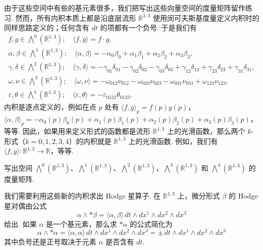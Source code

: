 由于这些空间中有些的基元素很多，我们把写出这些向量空间的度量矩阵留作练习. 然而，所有内积本质上都是沿底层流形 $\mathbb{R}^{1,3}$ 使用闵可夫斯基度量定义内积时的同样思路定义的；任何含有 $dt$ 的项都有一个负号. 于是我们有
\begin{align*}
f,g\in\bigwedge^0(\mathbb{R}^{1,3});\quad \langle f,g\rangle=f\cdot g, \\
\alpha,\beta\in\bigwedge^1(\mathbb{R}^{1,3});\quad \langle\alpha,\beta\rangle=-\alpha_0\beta_0+\alpha_1\beta_1+\alpha_2\beta_2+\alpha_3\beta_3, \\
\gamma,\delta\in\bigwedge^2(\mathbb{R}^{1,3});\quad \langle\gamma,\delta\rangle=-\gamma_{01}\delta_{01}-\gamma_{02}\delta_{02}-\gamma_{03}\delta_{03}+\gamma_{12}\delta_{12}+\gamma_{23}\delta_{23}+\gamma_{31}\delta_{31}, \\
\omega,\nu\in\bigwedge^3(\mathbb{R}^{1,3});\quad \langle\omega,\nu\rangle=-\omega_{012}\nu_{012}-\omega_{023}\nu_{023}-\omega_{031}\nu_{031}+\omega_{123}\nu_{123}, \\
\varepsilon,\theta\in\bigwedge^4(\mathbb{R}^{1,3});\quad \langle\varepsilon,\theta\rangle=-\varepsilon_{0123}\theta_{0123}.
\end{align*}
内积是逐点定义的，例如在点 $p$ 处有 $\langle f,g\rangle_p=f(p)g(p)$，$\langle\alpha,\beta\rangle_p=-\alpha_0(p)\beta_0(p)+\alpha_1(p)\beta_1(p)+\alpha_2(p)\beta_2(p)+\alpha_3(p)\beta_3(p)$，等等. 因此，如果用来定义形式的函数都是流形 $\mathbb{R}^{1,3}$ 上的光滑函数，那么两个 $k$-形式（$k=0,1,2,3,4$）的内积就是 $\mathbb{R}^{1,3}$ 上的光滑函数. 例如，我们有 $\langle f,g\rangle:\mathbb{R}^{1,3}\to\mathbb{R}$，等等.

\begin{question}\label{q:12-5}
写出空间 $\bigwedge^0(\mathbb{R}^{1,3})$、$\bigwedge^1(\mathbb{R}^{1,3})$、$\bigwedge^2(\mathbb{R}^{1,3})$、$\bigwedge^3(\mathbb{R}^{1,3})$ 和 $\bigwedge^4(\mathbb{R}^{1,3})$ 的度量矩阵.
\end{question}

我们需要利用这些新的内积求出 Hodge 星算子. 在 $\mathbb{R}^{1,3}$ 上，微分形式 $\beta$ 的 Hodge 星对偶由公式
\[
\alpha\wedge\ast\beta=\langle\alpha,\beta\rangle\,dt\wedge dx^1\wedge dx^2\wedge dx^3
\]
给出. 如果 $\alpha$ 是一个基元素，那么求 $\ast\alpha$ 的公式简化为
\[
\alpha\wedge\ast\alpha=\langle\alpha,\alpha\rangle\,dt\wedge dx^1\wedge dx^2\wedge dx^3=\pm\,dt\wedge dx^1\wedge dx^2\wedge dx^3
\]
其中负号还是正号取决于元素 $\alpha$ 是否含有 $dt$.

